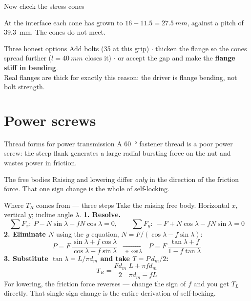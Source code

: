 \documentclass[aspectratio=169,10pt]{beamer}
\begin{document}
\begin{frame}{Now check the stress cones}
\centering
\resizebox{!}{3.2cm}{}
\vfill
\raggedright
{\small At the interface each cone has grown to $16+11.5=\SI{27.5}{mm}$, against a pitch of
\SI{39.3}{mm}. \alert{The cones do not meet.}}
\vspace{3pt}
\begin{alertblock}{Three honest options}
Add bolts (35 at this grip) $\cdot$ thicken the flange so the cones spread further ($l=\SI{40}{mm}$
closes it) $\cdot$ or accept the gap and make the \textbf{flange stiff in bending}.\\[3pt]
Real flanges are thick for exactly this reason: \alert{the driver is flange bending, not bolt
strength.}
\end{alertblock}
\end{frame}

\section{Power screws}

\begin{frame}{Thread forms for power transmission}
\centering
\resizebox{0.98\textwidth}{!}{}
\vfill
{\small A \SI{60}{\degree} fastener thread is a poor power screw: the steep flank generates a large
radial bursting force on the nut and wastes power in friction.}
\end{frame}

\begin{frame}{The free bodies}
\centering
\resizebox{0.86\textwidth}{!}{}
\vfill
{\small Raising and lowering differ \emph{only} in the direction of the friction force. That one sign
change is the whole of self-locking.}
\end{frame}

\begin{frame}{Where $T_R$ comes from --- three steps}
Take the raising free body. Horizontal $x$, vertical $y$; incline angle $\lambda$.
\vfill
\textbf{1. Resolve.}
\[
\sum F_x:\ P - N\sin\lambda - fN\cos\lambda = 0,
\qquad
\sum F_y:\ -F + N\cos\lambda - fN\sin\lambda = 0
\]
\textbf{2. Eliminate $N$} using the $y$ equation, $N = F/(\cos\lambda - f\sin\lambda)$:
\[
P = F\,\frac{\sin\lambda + f\cos\lambda}{\cos\lambda - f\sin\lambda}
\;\;\xrightarrow[\ \div\cos\lambda\ ]{}\;\;
P = F\,\frac{\tan\lambda + f}{1 - f\tan\lambda}
\]
\textbf{3. Substitute $\tan\lambda = L/\pi d_m$ and take $T=P\,d_m/2$:}
\[
\boxed{\;T_R = \frac{F d_m}{2}\,\frac{L + \pi f d_m}{\pi d_m - f L}\;}
\]
\vfill
{\small For lowering, the friction force reverses --- change the sign of $f$ and you get $T_L$
directly. \alert{That single sign change is the entire derivation of self-locking.}}
\end{frame}
\end{document}
